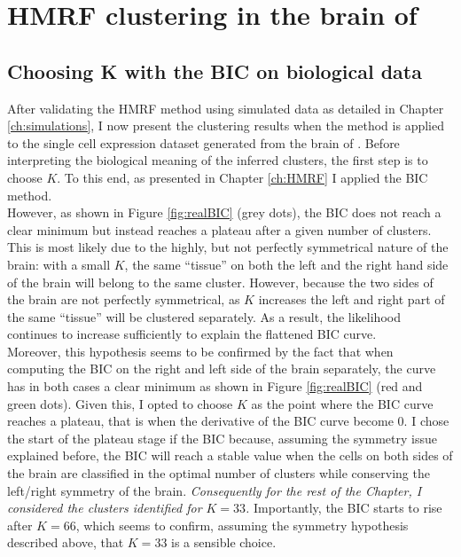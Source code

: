 \chapter{HMRF clustering in the brain of \platyfull{}}\label{ch:biology} 


	\section{Choosing K with the BIC on biological data}
	After validating the HMRF method using simulated data as detailed in Chapter \ref{ch:simulations}, I now present the clustering results when the method is applied to the single cell expression dataset generated from the brain of \platy{}. Before interpreting the biological meaning of the inferred clusters, the first step is to choose $K$. To this end, as presented in Chapter \ref{ch:HMRF} I applied the BIC method.\\
	
	However, as shown in Figure \ref{fig:realBIC} (grey dots), the BIC does not reach a clear minimum but instead reaches a plateau after a given number of clusters. This is most likely due to the highly, but not perfectly symmetrical nature of the brain: with a small $K$, the same ``tissue'' on both the left and the right hand side of the brain will belong to the same cluster. However, because the two sides of the brain are not perfectly symmetrical, as $K$ increases the left and right part of the same ``tissue'' will be clustered separately. As a result, the likelihood continues to increase sufficiently to explain the flattened BIC curve.\\
	
	 Moreover, this hypothesis seems to be confirmed by the fact that when computing the BIC on the right and left side of the brain separately, the curve has in both cases a clear minimum as shown in Figure \ref{fig:realBIC} (red and green dots). Given this, I opted to choose $K$ as the point where the BIC curve reaches a plateau, that is when the derivative of the BIC curve become 0. I chose the start of the plateau stage if the BIC because, assuming the symmetry issue explained before, the BIC will reach a stable value when the cells on both sides of the brain are classified in the optimal number of clusters while conserving the left/right symmetry of the brain. \emph{Consequently for the rest of the Chapter, I considered the clusters identified for $K = 33$.} Importantly, the BIC starts to rise after $K=66$, which seems to confirm, assuming the symmetry hypothesis described above, that $K=33$ is a sensible choice. \\
	 

